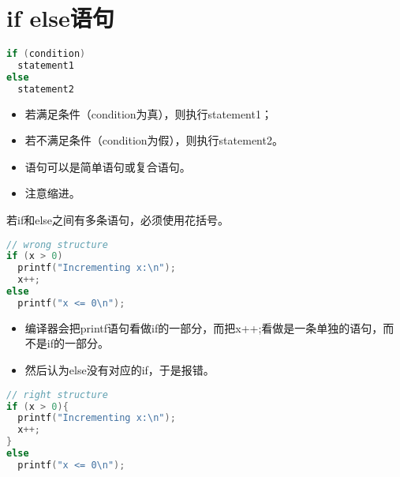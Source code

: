 \section{if else语句}

\begin{frame}[fragile]\ft{\secname}
\begin{lstlisting}[language=c]
if (condition)
  statement1
else
  statement2
\end{lstlisting} \pause 
\begin{itemize}
\item  若满足条件（condition为真），则执行statement1；
\item[]若不满足条件（condition为假），则执行statement2。\\[0.1in]
\item 语句可以是简单语句或复合语句。\\[0.1in]
\item 注意缩进。
\end{itemize}
\end{frame}

\begin{frame}[fragile]\ft{\secname}
若if和else之间有多条语句，\textcolor{acolor3}{必须}使用花括号。
\begin{lstlisting}[language=c]
// wrong structure
if (x > 0)
  printf("Incrementing x:\n");
  x++;
else
  printf("x <= 0\n");
\end{lstlisting}\pause
\begin{itemize}
\item  编译器会把printf语句看做if的一部分，而把x++;看做是一条单独的语句，而不是if的一部分。\\[0.1in]
\item 然后认为else没有对应的if，于是报错。
\end{itemize}
\end{frame}

\begin{frame}[fragile]\ft{\secname}
\begin{lstlisting}[language=c]
// right structure
if (x > 0){
  printf("Incrementing x:\n");
  x++;
}	
else
  printf("x <= 0\n");
\end{lstlisting}
\end{frame}



